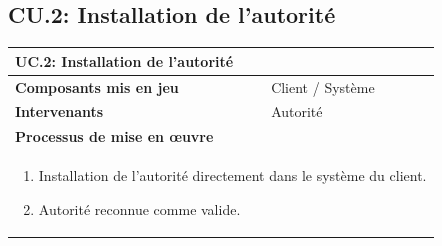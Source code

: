 \documentclass[a4paper,11pt,french]{article}
\begin{document}
\subsection{CU.2: Installation de l'autorité}
\begin{center}
        \vspace*{0.7cm}
        \begin{tabularx}{16cm}{|l|X|}
        \hline
        \multicolumn{2}{|l|}{\textbf{UC.2: Installation de l'autorité }}\\
        \hline
        \textbf{Composants mis en jeu} & Client / Système\\
        \hline
        \textbf{Intervenants} & Autorité \\
        \hline
        \multicolumn{2}{|l|}{\textbf{Processus de mise en \oe uvre}}\\
        \hline
        \multicolumn{2}{|p{15cm}|}{\begin{enumerate}\item Installation de l'autorité directement dans le système du client. \item  Autorité reconnue comme valide.\end{enumerate}}\\
        \hline
        \end{tabularx}
\end{center}

\end{document}
